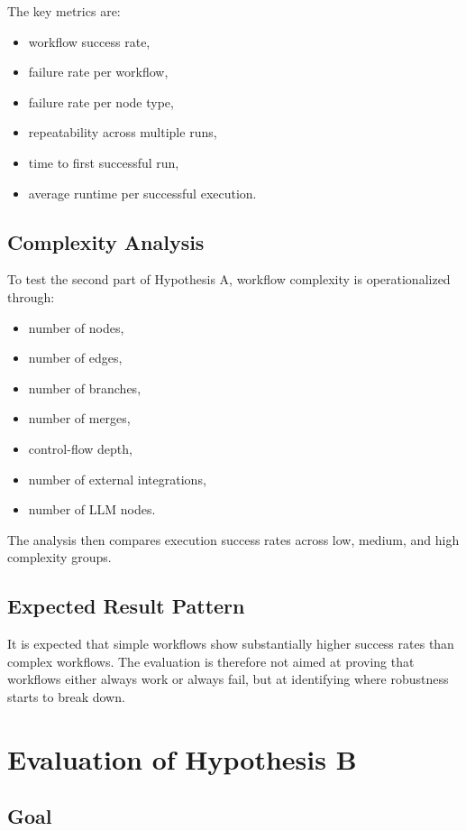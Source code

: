 \documentclass[12pt,a4paper]{article}
\begin{document}
The key metrics are:

\begin{itemize}
  \item workflow success rate,
  \item failure rate per workflow,
  \item failure rate per node type,
  \item repeatability across multiple runs,
  \item time to first successful run,
  \item average runtime per successful execution.
\end{itemize}

\subsection{Complexity Analysis}

To test the second part of Hypothesis A, workflow complexity is operationalized through:

\begin{itemize}
  \item number of nodes,
  \item number of edges,
  \item number of branches,
  \item number of merges,
  \item control-flow depth,
  \item number of external integrations,
  \item number of LLM nodes.
\end{itemize}

The analysis then compares execution success rates across low, medium, and high complexity groups.

\subsection{Expected Result Pattern}

It is expected that simple workflows show substantially higher success rates than complex workflows. The evaluation is therefore not aimed at proving that workflows either always work or always fail, but at identifying where robustness starts to break down.

\section{Evaluation of Hypothesis B}

\subsection{Goal}
\end{document}
